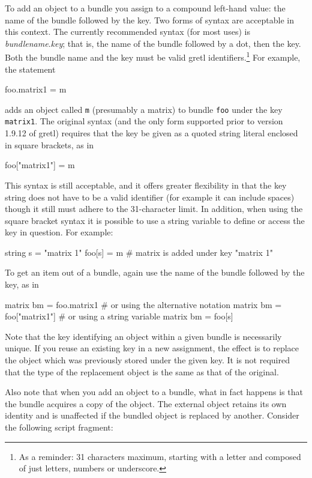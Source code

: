 To add an object to a bundle you assign to a compound left-hand value:
the name of the bundle followed by the key. Two forms of syntax are
acceptable in this context. The currently recommended syntax (for most
uses) is \textsl{bundlename}.\textsl{key}; that is, the name of the
bundle followed by a dot, then the key. Both the bundle name and the
key must be valid gretl identifiers.\footnote{As a reminder: 31
  characters maximum, starting with a letter and composed of just
  letters, numbers or underscore.} For example, the statement
%
\begin{code}
foo.matrix1 = m
\end{code}
%
adds an object called \texttt{m} (presumably a matrix) to bundle
\texttt{foo} under the key \texttt{matrix1}. The original syntax (and
the only form supported prior to version 1.9.12 of gretl) requires
that the key be given as a quoted string literal enclosed in square
brackets, as in
%
\begin{code}
foo["matrix1"] = m
\end{code}
%
This syntax is still acceptable, and it offers greater flexibility in
that the key string does not have to be a valid identifier (for
example it can include spaces) though it still must adhere to the
31-character limit. In addition, when using the square bracket syntax
it is possible to use a string variable to define or access the key in
question. For example:
%
\begin{code}
string s = "matrix 1"
foo[s] = m # matrix is added under key "matrix 1"
\end{code}

To get an item out of a bundle, again use the name of the bundle
followed by the key, as in

\begin{code}
matrix bm = foo.matrix1
# or using the alternative notation
matrix bm = foo["matrix1"]
# or using a string variable
matrix bm = foo[s]
\end{code}

Note that the key identifying an object within a given bundle is
necessarily unique. If you reuse an existing key in a new assignment,
the effect is to replace the object which was previously stored under
the given key. It is not required that the type of the replacement
object is the same as that of the original.

Also note that when you add an object to a bundle, what in fact
happens is that the bundle acquires a copy of the object. The external
object retains its own identity and is unaffected if the bundled
object is replaced by another. Consider the following script fragment:

